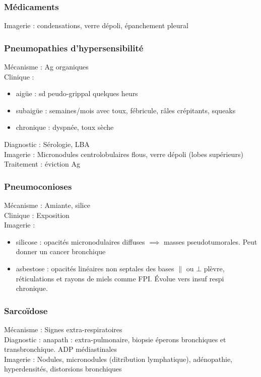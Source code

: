 \documentclass{article}
\begin{document}
\subsubsection{Médicaments}
Imagerie : condensations, verre dépoli, épanchement pleural

\subsubsection{Pneumopathies d'hypersensibilité}
Mécanisme : Ag organiques\\
Clinique : 
\begin{itemize}
\item aigüe : sd peudo-grippal quelques heurs
\item subaigüe : semaines/mois avec toux, fébricule, râles crépitants, squeaks
\item chronique : dyspnée, toux sèche
\end{itemize}
Diagnostic : Sérologie, LBA\\
Imagerie : Micronodules centrolobulaires flous, verre dépoli (lobes supérieurs)\\
Traitement : éviction Ag

\subsubsection{Pneumoconioses}
Mécanisme : Amiante, silice\\
Clinique : Exposition\\
Imagerie : 
\begin{itemize}
\item silicose : opacités micronodulaires diffuses \(\implies\) masses pseudotumorales. Peut donner un cancer bronchique
\item asbestose : opacités linéaires non septales des bases \(\parallel\) ou \(\bot\) plèvre, réticulations et rayons de miels comme FPI. Évolue vers insuf respi chronique.
\end{itemize}

\subsubsection{Sarcoïdose}
Mécanisme : Signes extra-respiratoires\\
Diagnostic : anapath : extra-pulmonaire, biopsie éperons bronchiques et transbronchique. ADP médiastinales \\
Imagerie : Nodules, micronodules (ditribution lymphatique), adénopathie, hyperdensités, distorsions bronchiques
\end{document}

